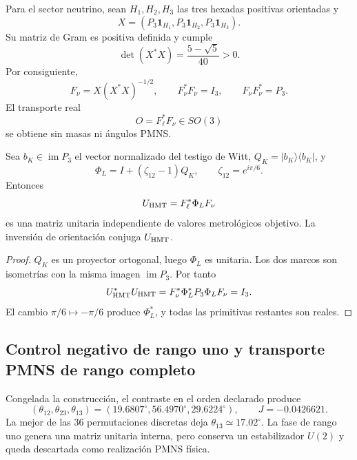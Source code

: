 Para el sector neutrino, sean \(H_1,H_2,H_3\) las tres hexadas positivas
orientadas y
\[
 X=(P_3\mathbf1_{H_1},P_3\mathbf1_{H_2},P_3\mathbf1_{H_3}).
\]
Su matriz de Gram es positiva definida y cumple
\[
 \det(X^*X)=\frac{5-\sqrt5}{40}>0.
\]
Por consiguiente,
\[
 F_\nu=X(X^*X)^{-1/2},
 \qquad F_\nu^*F_\nu=I_3,
 \qquad F_\nu F_\nu^*=P_3.
\]
El transporte real
\begin{equation}
 O=F_\ell^*F_\nu\in SO(3)
 \label{eq:transporte-frames-pmns-rev11}
\end{equation}
se obtiene sin masas ni ángulos PMNS.

\begin{theorem}
\label{thm:unitaria-interna-pmns-rev11}
Sea \(b_K\in\operatorname{im}P_3\) el vector normalizado del testigo de Witt,
\(Q_K=|b_K\rangle\langle b_K|\), y
\[
 \Phi_L=I+(\zeta_{12}-1)Q_K,
 \qquad \zeta_{12}=e^{i\pi/6}.
\]
Entonces
\begin{equation}
 U_{\rm HMT}=F_\ell^*\Phi_LF_\nu
 \label{eq:unitaria-interna-pmns-rev11}
\end{equation}
es una matriz unitaria independiente de valores metrológicos objetivo. La
inversión de orientación conjuga
\(U_{\rm HMT}\).
\end{theorem}

\begin{proof}
\(Q_K\) es un proyector ortogonal, luego \(\Phi_L\) es unitaria. Los dos
marcos son isometrías con la misma imagen \(\operatorname{im}P_3\). Por
tanto
\[
 U_{\rm HMT}^*U_{\rm HMT}
 =F_\nu^*\Phi_L^*P_3\Phi_LF_\nu=I_3.
\]
El cambio \(\pi/6\mapsto-\pi/6\) produce \(\Phi_L^*\), y todas las
primitivas restantes son reales.
\end{proof}

\subsection{Control negativo de rango uno y transporte PMNS de rango completo}
\label{sec:no-go-pmns-rango-uno-rev11}

Congelada la construcción, el contraste en el orden declarado produce
\[
 (\theta_{12},\theta_{23},\theta_{13})
 =(19.6807^\circ,56.4970^\circ,29.6224^\circ),
 \qquad J=-0.0426621.
\]
La mejor de las 36 permutaciones discretas deja
\(\theta_{13}\simeq17.02^\circ\). La fase de rango uno genera una matriz
unitaria interna, pero conserva un estabilizador \(U(2)\) y queda descartada
como realización PMNS física.

